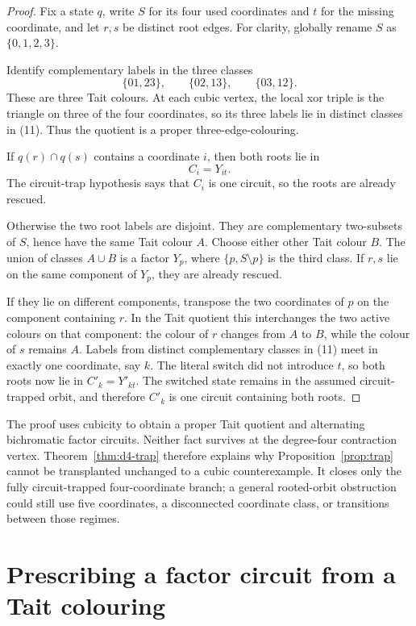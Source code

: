 \documentclass[11pt]{article}
\theoremstyle{definition}
\theoremstyle{remark}
\begin{document}
\begin{proof}
Fix a state \(q\), write \(S\) for its four used coordinates and \(t\) for
the missing coordinate, and let \(r,s\) be distinct root edges.  For
clarity, globally rename \(S\) as \(\{0,1,2,3\}\).

Identify complementary labels in the three classes
\[
 \{01,23\},\qquad \{02,13\},\qquad \{03,12\}.                \tag{11}
\]
These are three Tait colours.  At each cubic vertex, the local xor triple
is the triangle on three of the four coordinates, so its three labels lie
in distinct classes in (11).  Thus the quotient is a proper
three-edge-colouring.

If \(q(r)\cap q(s)\) contains a coordinate \(i\), then both roots lie in
\[
 C_i=Y_{it}.
\]
The circuit-trap hypothesis says that \(C_i\) is one circuit, so the roots
are already rescued.

Otherwise the two root labels are disjoint.  They are complementary
two-subsets of \(S\), hence have the same Tait colour \(A\).  Choose either
other Tait colour \(B\).  The union of classes \(A\cup B\) is a factor
\(Y_p\), where \(\{p,S\setminus p\}\) is the third class.  If \(r,s\) lie
on the same component of \(Y_p\), they are already rescued.

If they lie on different components, transpose the two coordinates of
\(p\) on the component containing \(r\).  In the Tait quotient this
interchanges the two active colours on that component: the colour of \(r\)
changes from \(A\) to \(B\), while the colour of \(s\) remains \(A\).
Labels from distinct complementary classes in (11) meet in exactly one
coordinate, say \(k\).  The literal switch did not introduce \(t\), so
both roots now lie in \(C'_k=Y'_{kt}\).  The switched state remains in the
assumed circuit-trapped orbit, and therefore \(C'_k\) is one circuit
containing both roots.
\end{proof}

The proof uses cubicity to obtain a proper Tait quotient and alternating
bichromatic factor circuits.  Neither fact survives at the degree-four
contraction vertex.  Theorem~\ref{thm:d4-trap} therefore explains why
Proposition~\ref{prop:trap} cannot be transplanted unchanged to a cubic
counterexample.  It closes only the fully circuit-trapped four-coordinate
branch; a general rooted-orbit obstruction could still use five
coordinates, a disconnected coordinate class, or transitions between
those regimes.

\section{Prescribing a factor circuit from a Tait colouring}
\end{document}
